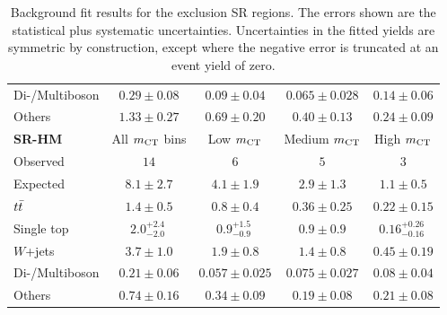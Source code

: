 \begin{table}
\begin{center}
{\begin{tabular}{lcccc}
Di-/Multiboson          & $0.29 \pm 0.08$          & $0.09 \pm 0.04$          & $0.065 \pm 0.028$          & $0.14 \pm 0.06$              \\
Others          & $1.33 \pm 0.27$          & $0.69 \pm 0.20$          & $0.40 \pm 0.13$          & $0.24 \pm 0.09$              \\
\bottomrule
\textbf{ SR-HM}           & All $m_{\textrm{CT}}$ bins          & Low $m_{\textrm{CT}}$         & Medium $m_{\textrm{CT}}$        & High $m_{\textrm{CT}}$    \\[-0.05cm]
\midrule
Observed           & $14$              & $6$              & $5$              & $3$                    \\
\midrule
 Expected          & $8.1 \pm 2.7$          & $4.1 \pm 1.9$          & $2.9 \pm 1.3$          & $1.1 \pm 0.5$              \\
\midrule
         $t\bar{t}$          & $1.4 \pm 0.5$          & $0.8 \pm 0.4$          & $0.36 \pm 0.25$          & $0.22 \pm 0.15$              \\
Single top          & $2.0_{-2.0}^{+2.4}~$          & $0.9_{-0.9}^{+1.5}~$         & $0.9 \pm 0.9$          & $0.16_{-0.16}^{+0.26}~$              \\
$W$+jets           & $3.7 \pm 1.0$          & $1.9 \pm 0.8$          & $1.4 \pm 0.8$          & $0.45 \pm 0.19$              \\
Di-/Multiboson          & $0.21 \pm 0.06$          & $0.057 \pm 0.025$          & $0.075 \pm 0.027$          & $0.08 \pm 0.04$              \\
Others          & $0.74 \pm 0.16$          & $0.34 \pm 0.09$          & $0.19 \pm 0.08$          & $0.21 \pm 0.08$              \\
\bottomrule
\end{tabular}
}
\end{center}
\caption{ Background fit results for the exclusion SR regions. %
The errors shown are the statistical plus systematic uncertainties.
Uncertainties in the fitted yields are symmetric by construction,
except where the negative error is truncated at an event yield of zero.
}
\label{table.results.yields.fit.SRLMEM}
\end{table}
%
